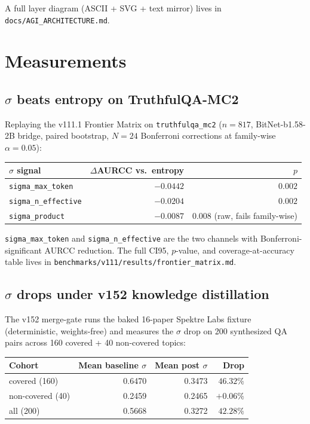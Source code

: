 \documentclass[11pt,letterpaper]{article}
\newcommand{\code}[1]{\texttt{#1}}
\begin{document}
A full layer diagram (ASCII + SVG + text mirror) lives in
\code{docs/AGI\_ARCHITECTURE.md}.

\section{Measurements}

\subsection{$\sigma$ beats entropy on TruthfulQA-MC2}

Replaying the v111.1 Frontier Matrix on \code{truthfulqa\_mc2}
($n = 817$, BitNet-b1.58-2B bridge, paired bootstrap, $N = 24$
Bonferroni corrections at family-wise $\alpha = 0.05$):

\begin{center}
\begin{tabular}{@{}lrr@{}}
\toprule
$\sigma$ signal & $\Delta$AURCC vs.\ entropy & $p$ \\
\midrule
\code{sigma\_max\_token}    & $\mathbf{-0.0442}$ & $\mathbf{0.002}$ \\
\code{sigma\_n\_effective}  & $\mathbf{-0.0204}$ & $\mathbf{0.002}$ \\
\code{sigma\_product}       & $-0.0087$ & $0.008$ (raw, fails family-wise) \\
\bottomrule
\end{tabular}
\end{center}

\code{sigma\_max\_token} and \code{sigma\_n\_effective} are the
two channels with Bonferroni-significant AURCC reduction. The full
CI95, $p$-value, and coverage-at-accuracy table lives in
\code{benchmarks/v111/results/frontier\_matrix.md}.

\subsection{$\sigma$ drops under v152 knowledge distillation}

The v152 merge-gate runs the baked 16-paper Spektre Labs fixture
(deterministic, weights-free) and measures the $\sigma$ drop on
200 synthesized QA pairs across 160 covered + 40 non-covered
topics:

\begin{center}
\begin{tabular}{@{}lrrr@{}}
\toprule
Cohort & Mean baseline $\sigma$ & Mean post $\sigma$ & Drop \\
\midrule
covered (160)    & 0.6470 & 0.3473 & $\mathbf{46.32\%}$ \\
non-covered (40) & 0.2459 & 0.2465 & $+0.06\%$ \\
all (200)        & 0.5668 & 0.3272 & $42.28\%$ \\
\bottomrule
\end{tabular}
\end{center}
\end{document}
